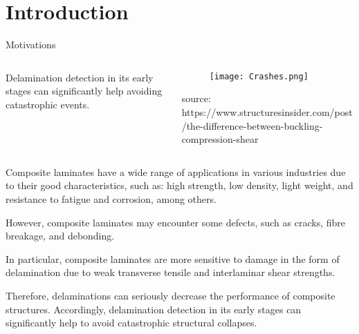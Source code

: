 \documentclass[10pt,aspectratio=169,dvipsnames]{beamer} %
\begin{document}
	\section{Introduction}
	\begin{frame}{Motivations}
		\begin{columns}[T]
			\begin{column}[t]{.55\textwidth}
				\begin{figure}[t]
				\end{figure}
				\begin{tcolorbox}
					\justifying\noindent\alert{Delamination detection} in its early stages can significantly help avoiding catastrophic events.
				\end{tcolorbox}				
			\end{column}
			\begin{column}[t]{0.45\textwidth}
				\begin{figure}[t]
					\texttt{[image: Crashes.png]}
				\end{figure}
			\tiny {source: https://www.structuresinsider.com/post/the-difference-between-buckling-compression-shear}
			\end{column}
		\end{columns}
	\end{frame}
	\note
	{
		Composite laminates have a wide range of applications in various industries due to their good characteristics, such as:
		high strength, low density, light weight, and resistance to fatigue and corrosion, among others.
		
		However, composite laminates may encounter some defects, such as cracks, fibre breakage, and debonding.
		
		In particular, composite laminates are more sensitive to damage in the form of delamination due to weak transverse tensile and interlaminar shear strengths.
			
		Therefore, delaminations can seriously decrease the performance of composite structures.
		Accordingly, delamination detection in its early stages can significantly help to avoid catastrophic structural collapses.
	}
\end{document}
